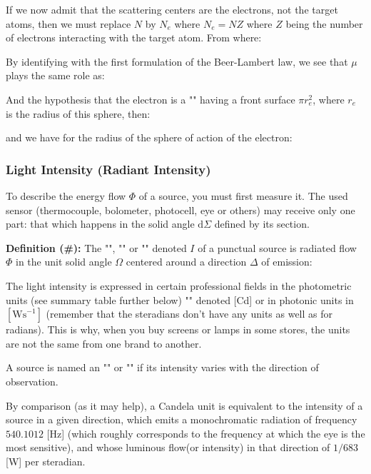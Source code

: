 	If we now admit that the scattering centers are the electrons, not the target atoms, then we must replace $N$ by $N_e$ where $N_e=NZ$ where $Z$  being the number of electrons interacting with the target atom. From where:
	
	By identifying with the first formulation of the Beer-Lambert law, we see that $\mu$ plays the same role as:
	
	And the hypothesis that the electron is a "" having a front surface $\pi r_e^2$, where $r_e$ is the radius of this sphere, then:
	
	and we have for the radius of the sphere of action of the electron:
	
	
	\subsubsection{Light Intensity (Radiant Intensity)}\label{solid angle optics}
	To describe the energy flow $\Phi$ of a source, you must first measure it. The used sensor (thermocouple, bolometer, photocell, eye or others) may receive only one part: that which happens in the solid angle  $\mathrm{d}\Sigma$ defined by its section.

	 \textbf{Definition (\#\mydef):} The "", "" or "" denoted $I$ of a punctual source is radiated flow $\Phi$ in the unit solid angle $\Omega$ centered around a direction $\Delta$ of emission:
	
	The light intensity is expressed in certain professional fields in the photometric units (see summary table further below) "" denoted [Cd] or in photonic units in $[\text{Ws}^{-1}]$ (remember that the steradians don't have any units as well as for radians). This is why, when you buy screens or lamps in some stores, the units are not the same from one brand to another.
	\begin{tcolorbox}[title=Remark,colframe=black,arc=10pt]
	A source is named an "" or "" if its intensity varies with the direction of observation.
	\end{tcolorbox}	
	By comparison (as it may help), a Candela unit is equivalent to the intensity of a source in a given direction, which emits a monochromatic radiation of frequency $540.1012$ [Hz] (which roughly corresponds to the frequency at which the eye is the most sensitive), and whose luminous flow(or intensity) in that direction of $1/683$ [W] per steradian.
	
